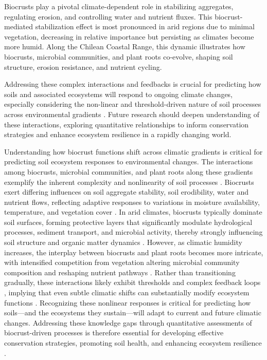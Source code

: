 Biocrusts play a pivotal climate-dependent role in stabilizing aggregates, regulating erosion, and controlling water and nutrient fluxes. This biocrust-mediated stabilization effect is most pronounced in arid regions due to minimal vegetation, decreasing in relative importance but persisting as climates become more humid. Along the Chilean Coastal Range, this dynamic illustrates how biocrusts, microbial communities, and plant roots co-evolve, shaping soil structure, erosion resistance, and nutrient cycling.

Addressing these complex interactions and feedbacks is crucial for predicting how soils and associated ecosystems will respond to ongoing climate changes, especially considering the non-linear and threshold-driven nature of soil processes across environmental gradients \citep{Bernhard2018,Wang2014}. Future research should deepen understanding of these interactions, exploring quantitative relationships to inform conservation strategies and enhance ecosystem resilience in a rapidly changing world.

Understanding how biocrust functions shift across climatic gradients is critical for predicting soil ecosystem responses to environmental changes. The interactions among biocrusts, microbial communities, and plant roots along these gradients exemplify the inherent complexity and nonlinearity of soil processes \citep{Wang2014}. Biocrusts exert differing influences on soil aggregate stability, soil erodibility, water and nutrient flows, reflecting adaptive responses to variations in moisture availability, temperature, and vegetation cover \citep{Belnap2003,Weber2022}. In arid climates, biocrusts typically dominate soil surfaces, forming protective layers that significantly modulate hydrological processes, sediment transport, and microbial activity, thereby strongly influencing soil structure and organic matter dynamics \citep{Kidron2021,RodriguezCaballero2018}. However, as climatic humidity increases, the interplay between biocrusts and plant roots becomes more intricate, with intensified competition from vegetation altering microbial community composition and reshaping nutrient pathways \citep{RiverasMunoz2022,Seitz2017}. Rather than transitioning gradually, these interactions likely exhibit thresholds and complex feedback loops \citep{Wang2014}, implying that even subtle climatic shifts can substantially modify ecosystem functions \citep{Bernhard2018}. Recognizing these nonlinear responses is critical for predicting how soils—and the ecosystems they sustain—will adapt to current and future climatic changes. Addressing these knowledge gaps through quantitative assessments of biocrust-driven processes is therefore essential for developing effective conservation strategies, promoting soil health, and enhancing ecosystem resilience \citep{BelnapBudel2016,Weber2022}.

